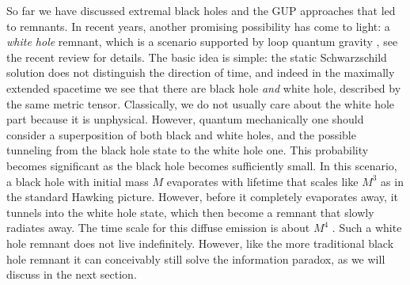 \documentclass[12pt,preprintnumbers, floatfix, preprintnumbers, letterpaper, superscriptaddress,nofootinbib]{revtex4-2}
\begin{document}
So far we have discussed extremal black holes and the GUP approaches that led to remnants. In recent years, another promising possibility has come to light: a \emph{white hole} remnant, which is a scenario supported by loop quantum gravity \cite{1801.03027,1802.04264,1805.03872,1905.07251,2009.05016,2105.06876,2207.06978}, see the recent review \cite{2407.09584} for details. The basic idea is simple: the static Schwarzschild solution does not distinguish the direction of time, and indeed in the maximally extended spacetime we see that there are black hole \emph{and} white hole, described by the same metric tensor. Classically, we do not usually care about the white hole part because it is unphysical. However, quantum mechanically one should consider a superposition of both black and white holes, and the possible tunneling from the black hole state to the white hole one. This probability becomes significant as the black hole becomes sufficiently small. In this scenario, a black hole with initial mass $M$ evaporates with lifetime that scales like $M^3$ as in the standard Hawking picture. However, before it completely evaporates away, it tunnels into the white hole state, which then become a remnant that slowly radiates away. The time scale for this diffuse emission is about $M^4$ \cite{2207.06978}. Such a white hole remnant does not live indefinitely. However, like the more traditional black hole remnant it can conceivably still solve the information paradox, as we will discuss in the next section. 
\end{document}
